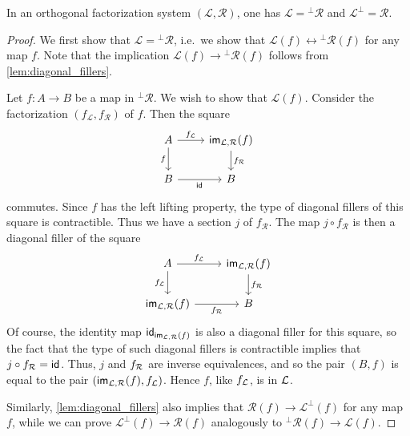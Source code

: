 \begin{lem}\label{lem:ofs_lifting}
In an orthogonal factorization system $(\mathcal{L},\mathcal{R})$, one has
$\mathcal{L}={^\bot\mathcal{R}}$ and $\mathcal{L}^\bot=\mathcal{R}$.
\end{lem}

\begin{proof}
We first show that $\mathcal{L}={^\bot\mathcal{R}}$, i.e.~we show that
$\mathcal{L}(f)\leftrightarrow {^\bot\mathcal{R}}(f)$ for any map $f$. Note
that the implication $\mathcal{L}(f)\to {^\bot\mathcal{R}}(f)$ follows from
\autoref{lem:diagonal_fillers}.

Let $f:A\to B$ be a map in ${^\bot\mathcal{R}}$.
We wish to show that $\mathcal{L}(f)$. Consider the factorization
$(f_{\mathcal{L}},f_{\mathcal{R}})$ of $f$. Then the square
\begin{equation*}
\begin{tikzcd}
A \arrow[r,"f_{\mathcal{L}}"] \arrow[d,swap,"f"] & \mathsf{im}_{\mathcal{L},\mathcal{R}}(f) \arrow[d,"f_{\mathcal{R}}"] \\
B \arrow[r,swap,"\idfunc"] & B
\end{tikzcd}
\end{equation*}
commutes. Since $f$ has the left lifting property, the type of diagonal fillers
of this square is contractible. Thus we have a section $j$ of $f_{\mathcal{R}}$.
The map $j\circ f_\mathcal{R}$ is then a diagonal filler of the square
\begin{equation*}
\begin{tikzcd}
A \arrow[r,"f_{\mathcal{L}}"] \arrow[d,swap,"f_{\mathcal{L}}"] & \mathsf{im}_{\mathcal{L},\mathcal{R}}(f) \arrow[d,"f_{\mathcal{R}}"] \\
\mathsf{im}_{\mathcal{L},\mathcal{R}}(f) \arrow[r,swap,"f_{\mathcal{R}}"] & B
\end{tikzcd}
\end{equation*}
Of course, the identity map $\idfunc[\mathsf{im}_{\mathcal{L},\mathcal{R}}(f)]$
is also a diagonal filler for this square, so the fact that the type of
such diagonal fillers is contractible implies that $j\circ f_{\mathcal{R}}=\idfunc$.
Thus, $j$ and $f_\cR$ are inverse equivalences, and so the pair $(B,f)$ is equal to the pair $(\mathsf{im}_{\mathcal{L},\mathcal{R}}(f),f_\cL)$.
Hence $f$, like $f_\cL$, is in $\cL$.

Similarly, \autoref{lem:diagonal_fillers} also implies that $\mathcal{R}(f)\to \mathcal{L}^\bot(f)$
for any map $f$, while we can prove $\mathcal{L}^\bot(f)\to\mathcal{R}(f)$ analogously to ${^\bot\mathcal{R}}(f)\to\mathcal{L}(f)$.
\end{proof}


